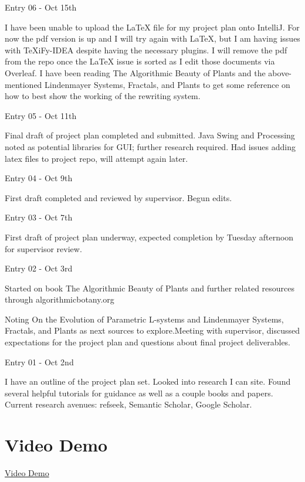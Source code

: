 \documentclass[]{interim_report}
\begin{document}
Entry 06 - Oct 15th

I have been unable to upload the LaTeX file for my project plan onto IntelliJ. For now the pdf version is up and I will try again with LaTeX, but I am having issues with TeXiFy-IDEA despite having the necessary plugins. I will remove the pdf from the repo once the LaTeX issue is sorted as I edit those documents via Overleaf.
I have been reading The Algorithmic Beauty of Plants and the above-mentioned Lindenmayer Systems, Fractals, and Plants to get some reference on how to best show the working of the rewriting system.

Entry 05 - Oct 11th

Final draft of project plan completed and submitted. Java Swing and Processing noted as potential libraries for GUI; further research required. Had issues adding latex files to project repo, will attempt again later.

Entry 04 - Oct 9th

First draft completed and reviewed by supervisor. Begun edits.

Entry 03 - Oct 7th

First draft of project plan underway, expected completion by Tuesday afternoon for supervisor review.

Entry 02 - Oct 3rd

Started on book The Algorithmic Beauty of Plants and further related resources through algorithmicbotany.org

Noting On the Evolution of Parametric L-systems and Lindenmayer Systems, Fractals, and Plants as next sources to explore.Meeting with supervisor, discussed expectations for the project plan and questions about final project deliverables.

Entry 01 - Oct 2nd

I have an outline of the project plan set. Looked into research I can site. Found several helpful tutorials for guidance as well as a couple books and papers. Current research avenues: refseek, Semantic Scholar, Google Scholar.

\section{Video Demo}

\href{https://youtu.be/dCie_R_jZ4k}{Video Demo}
\end{document}
